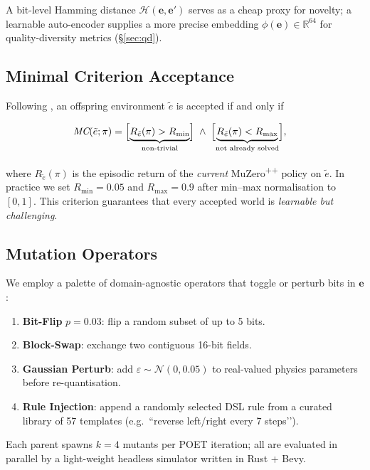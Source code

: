 A bit-level Hamming distance $\mathcal H(\mathbf e,\mathbf e')$
serves as a cheap proxy for novelty; a learnable auto-encoder supplies a
more precise embedding $\phi(\mathbf e)\in\mathbb R^{64}$ for quality-diversity metrics (§\ref{sec:qd}).

\subsection{Minimal Criterion Acceptance}\label{sec:mc}

Following \textcite{wang2019poet}, an offspring environment $\tilde e$ is
accepted if and only if

\begin{align}
\textit{MC}(\tilde e;\pi)&=
\Bigl[\underbrace{R_{\tilde e}(\pi) > R_{\min}}_{\text{non-trivial}}\Bigr]
\;\wedge\;
\Bigl[\underbrace{R_{\tilde e}(\pi) < R_{\max}}_{\text{not already solved}}\Bigr],
\end{align}

where $R_{\tilde e}(\pi)$ is the episodic return of the \emph{current}
MuZero\textsuperscript{++} policy on $\tilde e$.  In practice we set
$R_{\min}=0.05$ and $R_{\max}=0.9$ after min–max normalisation to $[0,1]$.
This criterion guarantees that every accepted world is \emph{learnable but
challenging}.

\subsection{Mutation Operators}

We employ a palette of domain-agnostic operators that toggle or perturb bits
in $\mathbf e$:

\begin{enumerate}[label=\textbf{M\arabic*}.]
\item \textbf{Bit-Flip} $p=0.03$: flip a random subset of up to 5 bits.
\item \textbf{Block-Swap}: exchange two contiguous 16-bit fields.
\item \textbf{Gaussian Perturb}: add $\varepsilon\sim\mathcal N(0,0.05)$ to
      real-valued physics parameters before re-quantisation.
\item \textbf{Rule Injection}: append a randomly selected DSL rule from a
      curated library of 57 templates (e.g.\ “reverse left/right every
      7 steps’’).
\end{enumerate}

Each parent spawns $k=4$ mutants per POET iteration; all are evaluated in
parallel by a light-weight headless simulator written in Rust + Bevy.

